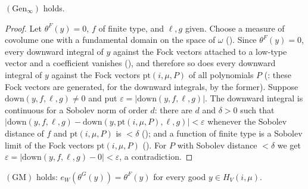\begin{lemma}\label{pf:stageU:geninf}
$(\mathrm{Gen}_\infty)$ holds.
\end{lemma}

\begin{proof}
Let $\theta^F(y)=0$, $f$ of finite type, and $\ell,g$ given. Choose a measure of covolume one with a fundamental domain on the
space of $\omega$ (). Since $\theta^F(y)=0$, every downward integral of $y$ against the
Fock vectors attached to a low-type vector and a coefficient vanishes
(), and therefore so does every downward integral of
$y$ against the Fock vectors $\mathrm{pt}(i,\mu,P)$ of all polynomials $P$
(: these Fock vectors are generated, for the downward
integrals, by the former). Suppose $\mathrm{down}(y,f,\ell,g)\ne0$ and put $\varepsilon=|\mathrm{down}(y,f,\ell,g)|$. The downward integral
is continuous for a Sobolev norm of order $d$: there are $d$ and $\delta>0$ such that $|\mathrm{down}(y,f,\ell,g)-\mathrm{down}(y,\mathrm{pt}
(i,\mu,P),\ell,g)|<\varepsilon$ whenever the Sobolev distance of $f$ and $\mathrm{pt}(i,\mu,P)$ is $<\delta$
(); and a function of finite type is a Sobolev limit of the Fock
vectors $\mathrm{pt}(i,\mu,P)$ (). For $P$ with Sobolev
distance $<\delta$ we get $\varepsilon=|\mathrm{down}(y,f,\ell,g)-0|<\varepsilon$, a contradiction.
\end{proof}

\begin{lemma}\label{pf:stageU:goodmem}
$(\mathrm{GM})$ holds: $e_W(\theta^G(y))=\theta^F(y)$ for every good $y\in H_V(i,\mu)$.
\end{lemma}

